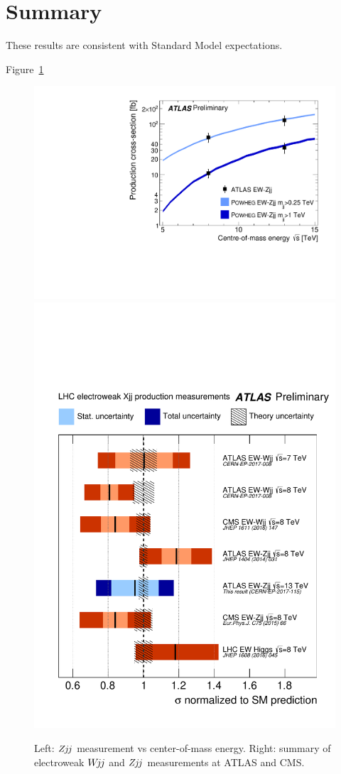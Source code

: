\documentclass{PoS}
\def\wjj{\ensuremath{W\kern -0.2em j\kern -0.1emj}\xspace}
\def\zjj{\ensuremath{Z\kern -0.1em j\kern -0.1emj}\xspace}
\begin{document}
\section{Summary}

These results are consistent with Standard Model expectations.

Figure~\ref{zjj-wjj-summary-results}

\begin{figure}
\centering
  \includegraphics[width=.57\textwidth]{STDM-2016-09/fig_06.pdf}
  \includegraphics[width=.42\textwidth]{STDM-2016-09/fig_09.pdf}
  \caption{Left: \zjj measurement vs center-of-mass energy. Right: summary of electroweak \wjj and \zjj
measurements at ATLAS and CMS.}
  \label{zjj-wjj-summary-results}
\end{figure}




\end{document}
